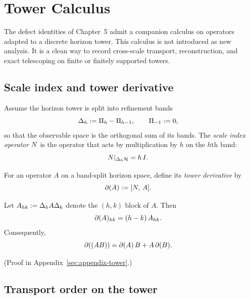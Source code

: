 \section{Tower Calculus}
\label{sec:tower-calculus}

The defect identities of Chapter~5 admit a companion calculus on operators
adapted to a discrete horizon tower. This calculus is not introduced as new
analysis. It is a clean way to record cross-scale transport, reconstruction, and exact
telescoping on finite or finitely supported towers.

\subsection{Scale index and tower derivative}
\label{subsec:tower-derivative}

\begin{definition}
\label{def:scale-index-operator}
Assume the horizon tower is split into refinement bands
\[
\Delta_h := \Pi_{h} - \Pi_{h-1},
\qquad
\Pi_{-1} := 0,
\]
so that the observable space is the orthogonal sum of its bands. The
\emph{scale index operator} $N$ is the operator that acts by
multiplication by $h$ on the $h$th band:
\[
N|_{\Delta_h \mathcal{H}} = h\, I.
\]
\end{definition}

\begin{definition}
\label{def:tower-derivative}
For an operator $A$ on a band-split horizon space, define its
\emph{tower derivative} by
\[
\partial(A) := [N,\, A].
\]
\end{definition}

\begin{lemma}
\label{lem:tower-derivative-block}
Let $A_{h k} := \Delta_h A \Delta_k$ denote the $(h,k)$ block of $A$.
Then
\[
\partial(A)_{h k} = (h-k)\, A_{h k}.
\]
Consequently,
\[
\partial((AB)) = \partial(A)\, B + A\, \partial(B).
\]
\end{lemma}

(Proof in Appendix~\ref{sec:appendix-tower}.)

\subsection{Transport order on the tower}
\label{subsec:tower-transport-order}

